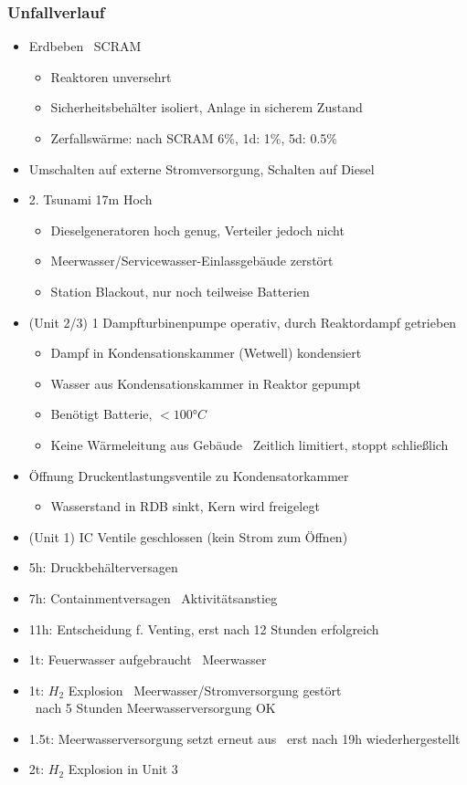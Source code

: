 \documentclass[12pt]{article}
\begin{document}
\subsubsection{Unfallverlauf}
\begin{itemize}
	\item Erdbeben \textrightarrow\ SCRAM
		\begin{itemize}
			\item Reaktoren unversehrt
			\item Sicherheitsbehälter isoliert, Anlage in sicherem Zustand
			\item Zerfallswärme: nach SCRAM 6\%, 1d: 1\%, 5d: 0.5\%
		\end{itemize}
	\item Umschalten auf externe Stromversorgung, Schalten auf Diesel
	\item 2. Tsunami 17m Hoch
		\begin{itemize}
			\item Dieselgeneratoren hoch genug, Verteiler jedoch nicht
			\item Meerwasser/Servicewasser-Einlassgebäude zerstört
			\item Station Blackout, nur noch teilweise Batterien
		\end{itemize}
	\item (Unit 2/3) 1 Dampfturbinenpumpe operativ, durch Reaktordampf getrieben
		\begin{itemize}
			\item Dampf in Kondensationskammer (Wetwell) kondensiert
			\item Wasser aus Kondensationskammer in Reaktor gepumpt
			\item Benötigt Batterie, \(<100\text{°}C\)
			\item Keine Wärmeleitung aus Gebäude \textrightarrow\ Zeitlich limitiert, stoppt schließlich
		\end{itemize}
	\item Öffnung Druckentlastungsventile zu Kondensatorkammer
		\begin{itemize}
			\item Wasserstand in RDB sinkt, Kern wird freigelegt
		\end{itemize}
	\item (Unit 1) IC Ventile geschlossen (kein Strom zum Öffnen)
	\item 5h: Druckbehälterversagen
	\item 7h: Containmentversagen \textrightarrow\ Aktivitätsanstieg
	\item 11h: Entscheidung f. Venting, erst nach 12 Stunden erfolgreich
	\item 1t: Feuerwasser aufgebraucht \textrightarrow\ Meerwasser
	\item 1t: \(H_2\) Explosion \textrightarrow\ Meerwasser/Stromversorgung gestört\\
		\textrightarrow\ nach 5 Stunden Meerwasserversorgung OK
	\item 1.5t: Meerwasserversorgung setzt erneut aus \textrightarrow\ erst nach 19h wiederhergestellt
	\item 2t: \(H_2\) Explosion in Unit 3
\end{itemize}
\end{document}
